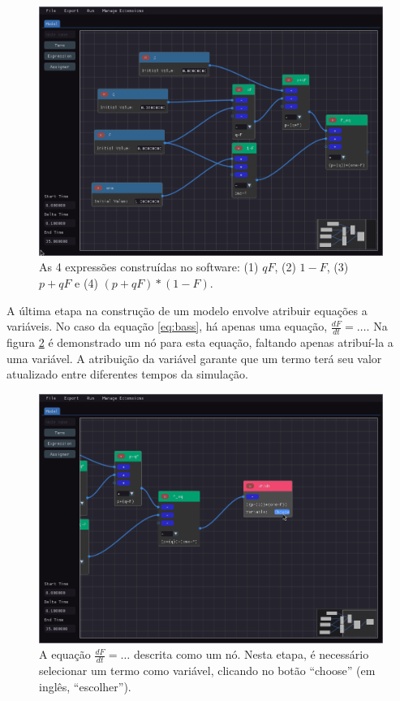 \documentclass[
	12pt,				%
	openright,			%
	oneside,			%
	a4paper,			%
	main=brazil,
	english,			%
	]{ufsj-abntex2}
\begin{document}
\begin{figure}[h]
    \centering
    \includegraphics[width=\textwidth]{imgs/ode-designer/passo-a-passo/expressoes.png} 
    \caption{As 4 expressões construídas no software: (1) $qF$, (2) $1-F$, (3) $p+qF$ e (4) $(p+qF)*(1-F)$.}
    \label{fig:expressoes}
\end{figure}

A última etapa na construção de um modelo envolve atribuir equações a variáveis. No caso da equação \ref{eq:bass}, há apenas uma equação, $\frac{dF}{dt} = \dots$. Na figura \ref{fig:equacao} é demonstrado um nó para esta equação, faltando apenas atribuí-la a uma variável. A atribuição da variável garante que um termo terá seu valor atualizado entre diferentes tempos da simulação.

\begin{figure}[h]
    \centering
    \includegraphics[width=\textwidth]{imgs/ode-designer/passo-a-passo/equacao.png} 
    \caption{A equação $\frac{dF}{dt} = \dots$ descrita como um nó. Nesta etapa, é necessário selecionar um termo como variável, clicando no botão ``choose'' (em inglês, ``escolher'').}
    \label{fig:equacao}
\end{figure}
\end{document}
